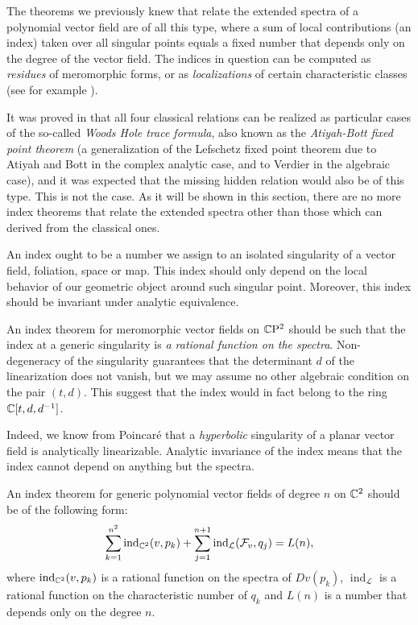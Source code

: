 \documentclass[phd,tocprelim]{cornell}
\begin{document}
The theorems we previously knew that relate the extended spectra of a polynomial vector field are of all this type, where a sum of local contributions (an index) taken over all singular points equals a fixed number that depends only on the degree of the vector field. The indices in question can be computed as \textit{residues} of meromorphic forms, or as \textit{localizations} of certain characteristic classes (see for example \cite{Suwa1998}).

It was proved in \cite{WoodsHole} that all four classical relations can be realized as particular cases of the so-called \textit{Woods Hole trace formula}, also known as the \textit{Atiyah-Bott fixed point theorem} (a generalization of the Lefschetz fixed point theorem due to Atiyah and Bott in the complex analytic case, and to Verdier in the algebraic case), and it was expected that the missing hidden relation would also be of this type. This is not the case. As it will be shown in this section, there are no more index theorems that relate the extended spectra other than those which can derived from the classical ones.

An index ought to be a number we assign to an isolated singularity of a vector field, foliation, space or map. This index should only depend on the local behavior of our geometric object around such singular point. Moreover, this index should be invariant under analytic equivalence.

\begin{remark}
 An index theorem for meromorphic vector fields on $\mathbb{C}\mathrm{P}^2$ should be such that the index at a generic singularity is \textit{a rational function on the spectra}. Non-degeneracy of the singularity guarantees that the determinant $d$ of the linearization does not vanish, but we may assume no other algebraic condition on the pair $(t,d)$. This suggest that the index would in fact belong to the ring $\mathbb{C}[t,d,d^{-1}]$.
\end{remark}
 
Indeed, we know from Poincar\'{e} that a \textit{hyperbolic} singularity of a planar vector field is analytically linearizable. Analytic invariance of the index means that the index cannot depend on anything but the spectra. 

\begin{proposition}\label{prop:expectedIndex}
 An index theorem for generic polynomial vector fields of degree $n$ on $\mathbb{C}^2$ should be of the following form:
  \[ \sum_{k=1}^{n^2} \operatorname{ind}_{\mathbb{C}^2}(v,p_k) + \sum_{j=1}^{n+1} \operatorname{ind}_{\mathcal{L}}(\mathcal{F}_v,q_j) = L(n), \]
 where $\operatorname{ind}_{\mathbb{C}^2}(v,p_k) $ is a rational function on the spectra of $Dv(p_k)$, $\operatorname{ind}_{\mathcal{L}}$ is a rational function on the characteristic number of $q_k$ and $L(n)$ is a number that depends only on the degree $n$.
\end{proposition}
\end{document}
